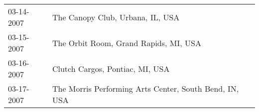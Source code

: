 \begin{supertabular}{ll}
 03-14-2007 &                        The Canopy Club, Urbana, IL, USA \\
 03-15-2007 &                   The Orbit Room, Grand Rapids, MI, USA \\
 03-16-2007 &                         Clutch Cargos, Pontiac, MI, USA \\
 03-17-2007 &  The Morris Performing Arts Center, South Bend, IN, USA \\
\end{supertabular}
